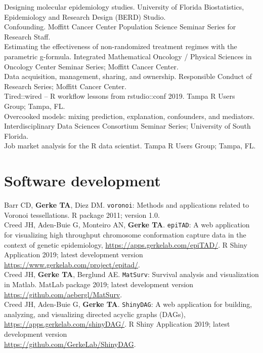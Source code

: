 \documentclass[11pt, a4paper]{article} %
\newcommand{\years}[1]{\marginnote{\scriptsize \raise .3ex\hbox{#1}}} %
\begin{document}
\years{2016}Designing molecular epidemiology studies. University of Florida Biostatistics, Epidemiology and Research Design (BERD) Studio.\\
\years{2017}Confounding. Moffitt Cancer Center Population Science Seminar Series for Research Staff.\\
\years{2018}Estimating the effectiveness of non-randomized treatment regimes with the parametric g-formula. Integrated Mathematical Oncology / Physical Sciences in Oncology Center Seminar Series; Moffitt Cancer Center.\\
\years{2018} Data acquisition, management, sharing, and ownership. Responsible Conduct of Research Series; Moffitt Cancer Center.\\
\years{2019} Tired::wired -- R workflow lessons from rstudio::conf 2019. Tampa R Users Group; Tampa, FL.\\
\years{2019} Overcooked models: mixing prediction, explanation, confounders, and mediators. Interdisciplinary Data Sciences Consortium Seminar Series; University of South Florida.\\
\years{2020} Job market analysis for the R data scientist. Tampa R Users Group; Tampa, FL.

\section*{Software development}
Barr CD, {\bf Gerke TA}, Diez DM. \verb|voronoi|: Methods and applications related to Voronoi tessellations. R package 2011; version 1.0.\\

Creed JH, Aden-Buie G, Monteiro AN, {\bf Gerke TA}. \verb|epiTAD|: A web application for visualizing high throughput chromosome conformation capture data in the context of genetic epidemiology, \href{https://apps.gerkelab.com/epiTAD/}{https://apps.gerkelab.com/epiTAD/}. R Shiny Application 2019; latest development version \href{https://www.gerkelab.com/project/epitad/}{https://www.gerkelab.com/project/epitad/}.\\

Creed JH, {\bf Gerke TA}, Berglund AE. \verb|MatSurv|: Survival analysis and visualization in Matlab. MatLab package 2019; latest development version \href{https://github.com/aebergl/MatSurv}{https://github.com/aebergl/MatSurv}.\\

Creed JH, Aden-Buie G, {\bf Gerke TA}. \verb|ShinyDAG|: A web application for building, analyzing, and visualizing directed acyclic graphs (DAGs), \href{https://apps.gerkelab.com/shinyDAG/}{https://apps.gerkelab.com/shinyDAG/}. R Shiny Application 2019; latest development version \\\href{https://github.com/GerkeLab/ShinyDAG}{https://github.com/GerkeLab/ShinyDAG}.\\
\end{document}
